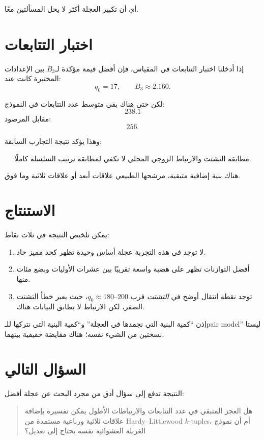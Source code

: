 \documentclass[12pt]{article}
\begin{document}
أي أن تكبير العجلة أكثر لا يحل المسألتين معًا.

\section{اختبار التتابعات}

إذا أدخلنا اختبار التتابعات في المقياس، فإن أفضل قيمة مؤكدة لـ\(B_3\) بين الإعدادات المختبرة كانت عند:
\[
\boxed{q_0=17,\qquad B_3\approx2.160.}
\]

لكن حتى هناك بقي متوسط عدد التتابعات في النموذج:
\[
238.1
\]
مقابل المرصود:
\[
256.
\]

وهذا يؤكد نتيجة التجارب السابقة:

\[
\boxed{\text{مطابقة التشتت والارتباط الزوجي المحلي لا تكفي لمطابقة ترتيب السلسلة كاملًا.}}
\]

هناك بنية إضافية متبقية، مرشحها الطبيعي علاقات أبعد أو علاقات ثلاثية وما فوق.

\section{الاستنتاج}

يمكن تلخيص النتيجة في ثلاث نقاط:

\begin{enumerate}
\item لا توجد في هذه التجربة عجلة أساس وحيدة تظهر كحد مميز حاد.
\item أفضل التوازنات تظهر على هضبة واسعة تقريبًا بين عشرات الأوليات وبضع مئات منها.
\item توجد نقطة انتقال أوضح في \emph{التشتت} قرب \(q_0\approx180\text{--}200\)، حيث يعبر خطأ التشتت الصفر، لكن الارتباط لا يطابق البيانات هناك.
\end{enumerate}

إذن ``كمية البنية التي نجمدها في العجلة'' و``كمية البنية التي نتركها للـpair model''
ليستا نسختين من الشيء نفسه؛ هناك مقايضة حقيقية بينهما.

\section{السؤال التالي}

النتيجة تدفع إلى سؤال أدق من مجرد البحث عن عجلة أفضل:

\begin{quote}
هل العجز المتبقي في عدد التتابعات والارتباطات الأطول يمكن تفسيره بإضافة
علاقات ثلاثية ورباعية مستمدة من Hardy--Littlewood \(k\)-tuples،
أم أن نموذج الغربلة العشوائية نفسه يحتاج إلى تعديل؟
\end{quote}
\end{document}
